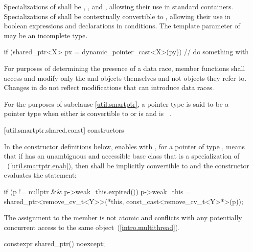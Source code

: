 \pnum
Specializations of  shall be ,
, and , allowing their use in standard
containers. Specializations of  shall be
contextually convertible to ,
allowing their use in boolean expressions and declarations in conditions. The template
parameter  of  may be an incomplete type.

\pnum
\begin{example}
\begin{codeblock}
if (shared_ptr<X> px = dynamic_pointer_cast<X>(py)) {
  // do something with 
}
\end{codeblock}
\end{example}

\pnum
For purposes of determining the presence of a data race, member functions shall
access and modify only the  and  objects
themselves and not objects they refer to. Changes in  do not
reflect modifications that can introduce data races.

\pnum
For the purposes of subclause \ref{util.smartptr},
a pointer type  is said to be
a pointer type  when either
 is convertible to  or
 is  and  is \cv{}~.

[util.smartptr.shared.const]{ constructors}

\pnum
In the constructor definitions below,
enables  with ,
for a pointer  of type ,
means that if  has an unambiguous and accessible base class
that is a specialization of ~(\ref{util.smartptr.enab}),
then  shall be implicitly convertible to  and
the constructor evaluates the statement:
\begin{codeblock}
if (p != nullptr && p->weak_this.expired())
  p->weak_this = shared_ptr<remove_cv_t<Y>>(*this, const_cast<remove_cv_t<Y>*>(p));
\end{codeblock}
The assignment to the  member is not atomic and
conflicts with any potentially concurrent access to the same object~(\ref{intro.multithread}).

%
\begin{itemdecl}
constexpr shared_ptr() noexcept;
\end{itemdecl}

